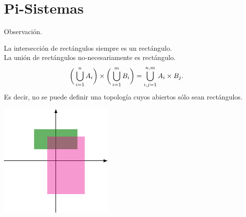 \documentclass{beamer}
\begin{document}
\section{Pi-Sistemas} %
\begin{frame}[t]
	\begin{block}{Observación.}
		\begin{minipage}{0.5\linewidth}
			La intersección de rectángulos siempre es un rectángulo. \\[2mm]
			La unión de rectángulos no-necesariamente es rectángulo.
			\[
				\bigg(\displaystyle\bigcup_{i=1}^{n} A_i\bigg) \times \bigg(\displaystyle\bigcup_{i=1}^{m} B_i\bigg) = \displaystyle\bigcup_{i,j = 1}^{n,m} A_i \times B_j.
			\]
			Es decir, no se puede definir una topología cuyos abiertos sólo sean rectángulos.
		\end{minipage}\hspace{5mm}
		\begin{minipage}{0.4\linewidth}
			\includegraphics[width= \linewidth, page = 1]{IMAGENES/1_PI_SISTEMAS/1/tikz.pdf}
		\end{minipage}
	\end{block}
\end{frame}
\end{document}
